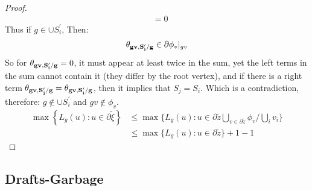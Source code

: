 \begin{proof}
\begin{equation*}
\begin{split}
  & = 0 
  \end{split}
\end{equation*}
Thus if  $g  \in \cup S^{\prime}_{i}$, Then: 
\begin{equation*}
  \begin{split}
    \mathbf{\theta_{gv ,S^{\prime}_{i}/g} }  \in \partial \phi_{v}|_{gv} 
  \end{split}
\end{equation*}
So for $\mathbf{\theta_{gv ,S^{\prime}_{i}/g} } = 0$, it must appear at least twice in the sum, yet the left terms in the sum cannot contain it (they differ by the root vertex), and if there is a right term $\mathbf{\theta_{gv ,S^{\prime}_{j}/g} } = \mathbf{\theta_{gv ,S^{\prime}_{i}/g} }$, then it implies that $S_{j} = S_{i}$. Which is a contradiction, therefore: $g \notin \cup S^{\prime}_{i}$ and $gv \notin \phi_{v}$. 
\begin{equation*}
  \begin{split}
    \max \left\{ L_{g}(u) : u \in \partial \tilde{\xi} \right\} & \le \max \big\{ L_{g}(u) : u \in  \partial \tilde{z} \bigcup_{v \in \partial \tilde{z} } \phi_{v} \big/ \bigcup_{i} v_{i} \big\}  \\ 
    & \le  \max \big\{ L_{g}(u) : u \in \partial \tilde{z} \big\} + 1 - 1
  \end{split}
\end{equation*}
\end{proof}


\subsection{Drafts-Garbage}

